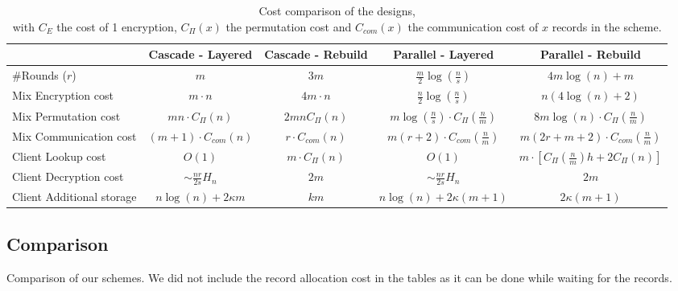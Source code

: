 \documentclass[USenglish,oneside,twocolumn]{article}
\begin{document}
\begin{table}
\vspace{0pt}
\centering
\begin{tabular}{l *4c}
\toprule
    					& Cascade - Layered	 			& Cascade - Rebuild							& Parallel - Layered 						& Parallel - Rebuild\\
\midrule
\#Rounds ($r$) & $m$ & $3m$ & $\frac{m}{2} \log\left( \frac{n}{s}\right)$ &  $4m\log(n) +  m$ \\
Mix Encryption cost & $m \cdot  n$ & $4m  \cdot  n$ & $\frac{n}{2} \log\left (\frac{n}{s}\right)$ & $n(4\log(n) + 2) $ \\
Mix Permutation cost & $m n \cdot C_{\Pi}(n)$ & $2 m n C_{\Pi}(n)$ & $m \log\left (\frac{n}{s}\right)\cdot C_{\Pi}\left(\frac{n}{m}\right)$ & $8m\log(n) \cdot C_{\Pi}\left ( \frac{n}{m} \right )$ \\
Mix Communication cost & $(m+1) \cdot C_{com}(n)$ & $r \cdot C_{com}(n)$ & $m(r+2) \cdot C_{com}\left(\frac{n}{m}\right)$ & $m(2r+m+2) \cdot C_{com}\left(\frac{n}{m}\right)$\\
Client Lookup cost & $O(1)$ & $m\cdot C_{\Pi}(n)$ & $O(1)$ & $m \cdot [C_{\Pi}\left ( \frac{n}{m}\right )h+ 2C_{\Pi}(n)]$\\
Client Decryption cost & $\sim \frac{nr}{2s} H_n$ & $2m$ & $\sim \frac{nr}{2s} H_n$ & $2m$\\
Client Additional storage & $n\log(n)+ 2 \kappa m$ & $km$ &$n\log(n)+ 2 \kappa  (m+1)$ & $2 \kappa  (m+1)$ \\
\bottomrule
\end{tabular}
\centering
\caption{Cost comparison of the designs, \\ with $C_{E}$ the cost of 1 encryption, $C_{\Pi}(x)$ the permutation cost and $C_{com}(x)$ the communication cost of $x$ records in the scheme.}
\end{table}

\subsection{Comparison}\label{Comparison}
Comparison of our schemes.
We did not include the record allocation cost in the tables as it can be done while waiting for the records.
\end{document}
